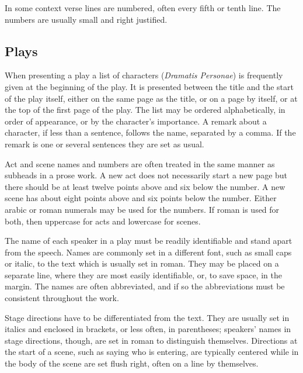 \documentclass[10pt,letterpaper,extrafontsizes]{memoir}
\begin{document}
    In some context verse lines are numbered, often every fifth or tenth line.
The numbers are usually small and right justified.

\subsection{Plays}

    When presenting a play a list of characters 
(\textit{Dramatis Personae})
is frequently given at the beginning of the play. It is presented between the
title and the start of the play itself, either on the same page as the title, 
or on a page by itself, or at the top of the first page of the play. The 
list may be ordered alphabetically, in order of appearance, or by the 
character's importance. A remark about a character, if less than a sentence, 
follows the name, separated by a comma. If the remark is one or several 
sentences they are set as usual.

    Act and scene 
names and numbers are often treated in the same manner as
subheads in a prose work. A new act does not necessarily start a new page
but there should be at least twelve points above and six below the number.
A new scene has about eight points above and six points below the number.
Either arabic or roman numerals may be used for the numbers. If roman
is used for both, then uppercase for acts and lowercase for scenes.

   The name of each speaker in a play must be readily 
identifiable and stand apart from the speech. Names are commonly set in a 
different font, such as small caps or italic, to the text which is usually set
in roman. They may be placed on a separate line, where they are most easily
identifiable, or, to save space, in the margin. The names are often 
abbreviated, and if so the abbreviations must be consistent throughout 
the work.

    Stage directions 
have to be differentiated from the text. They are usually set in italics 
and enclosed in brackets, or less often, in parentheses; speakers' names 
in stage directions, though, are set in roman to distinguish themselves. 
Directions at the start of a scene, such as saying who is entering, are 
typically centered while in the body of the scene are set flush right, 
often on a line by themselves.
\end{document}
